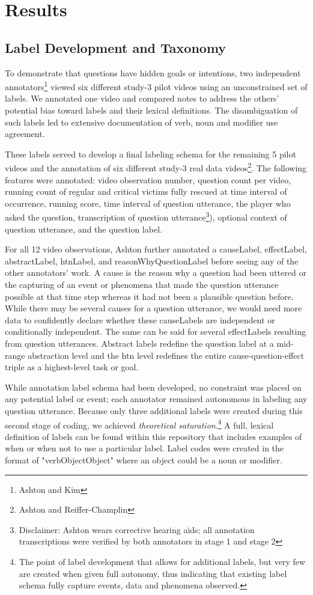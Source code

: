 \documentclass[10pt]{article}
\begin{document}
\newpage

\section{Results}
\subsection{Label Development and Taxonomy}

To demonstrate that questions have hidden goals or intentions, two independent annotators\footnote{Ashton and Kim} viewed six different study-3 pilot videos using an unconstrained set of labels. We annotated one video and compared notes to address the others' potential bias toward labels and their lexical definitions. The disambiguation of such labels led to extensive documentation of verb, noun and modifier use agreement. 

These labels served to develop a final labeling schema for the remaining 5 pilot videos and the annotation of six different study-3 real data videos\footnote{Ashton and Reiffer-Champlin}. The following features were annotated: video observation number, question count per video, running count of regular and critical victims fully rescued at time interval of occurrence, running score, time interval of question utterance, the player who asked the question, transcription of question utterance\footnote{Disclaimer: Ashton wears corrective hearing aids; all annotation transcriptions were verified by both annotators in stage 1 and stage 2}), optional context of question utterance, and the question label. 

For all 12 video observations, Ashton further annotated a causeLabel, effectLabel, abstractLabel, htnLabel, and reasonWhyQuestionLabel before seeing any of the other annotators' work. A cause is the reason why a question had been uttered or the capturing of an event or phenomena that made the question utterance possible at that time step whereas it had not been a plausible question before. While there may be several causes for a question utterance, we would need more data to confidently declare whether these causeLabels are independent or conditionally independent. The same can be said for several effectLabels resulting from question utterances. Abstract labels redefine the question label at a mid-range abstraction level and the htn level redefines the entire cause-question-effect triple as a highest-level task or goal. 

While annotation label schema had been developed, no constraint was placed on any potential label or event; each annotator remained autonomous in labeling any question utterance. Because only three additional labels were created during this second stage of coding, we achieved \emph{theoretical saturation}.\footnote{The point of label development that allows for additional labels, but very few are created when given full autonomy, thus indicating that existing label schema fully capture events, data and phenomena observed.} A full, lexical definition of labels can be found within this repository that includes examples of when or when not to use a particular label. Label codes were created in the format of "verbObjectObject" where an object could be a noun or modifier. 
\end{document}
